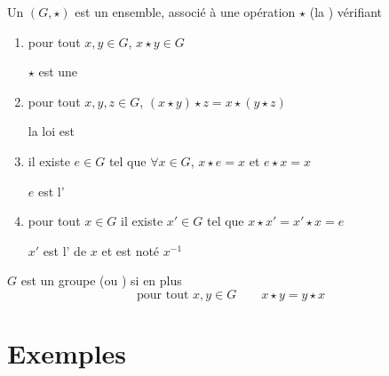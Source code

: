 \begin{frame}
\begin{mydefinition}
Un  $(G,\star)$ est un ensemble, associé à une opération $\star$ 
(la ) vérifiant 

\pause

\begin{enumerate}
  \item \label{it:groupei} pour tout $x,y \in G$, \quad $x \star y \in G$ 

\hfill $\star$ est une 

\pause

  \item \label{it:groupeii} pour tout $x,y,z \in G$, \quad $(x \star y) \star z = x \star (y \star z)$ 

\hfill la loi est 

\pause

  \item \label{it:groupeiii} il existe $e \in G$ tel que \quad $\forall x \in G$, $x \star e = x$ et $e \star x = x$ 

\hfill $e$ est l'

\pause

  \item \label{it:groupeiv} pour tout $x \in G$ il existe $x' \in G$ tel que \quad  $x \star x' = x' \star x = e$ 

\hfill $x'$ est l' de $x$ et est noté $x^{-1}$
\end{enumerate}
\end{mydefinition}

\bigskip
\pause

$G$ est un groupe  (ou ) si en plus
$$\text{pour tout } x,y \in G  \qquad x \star y = y \star x$$


\end{frame}



\section*{Exemples}


